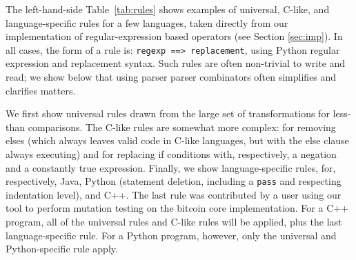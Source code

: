 \documentclass[sigconf,review, anonymous]{acmart}
\begin{document}
{%







  
The left-hand-side Table~\ref{tab:rules} shows examples of universal, C-like, and
language-specific rules for a few languages, taken directly from our
implementation of regular-expression based operators (see Section \ref{sec:imp}).  In all cases, the form of a rule is: {\tt regexp
  ==> replacement}, using Python regular expression and replacement
syntax.  Such rules are often non-trivial to write and read; we show
below that using parser parser combinators often simplifies and
clarifies matters.

We first show universal rules drawn from the large set of transformations for
less-than comparisons.  The C-like rules are somewhat more
complex: for removing elses (which always leaves valid code in
C-like languages, but with the else clause always executing) and for
replacing if conditions with, respectively, a negation and a
constantly true expression.  Finally, we show
language-specific rules, for, respectively, Java, Python (statement
deletion, including a {\tt pass} and respecting indentation level),
and C++.  The last rule was contributed by a user using our tool to
perform mutation testing on the bitcoin core implementation.  For a
C++ program, all of the universal rules and C-like rules will be
applied, plus the last language-specific rule.  For a Python
program, however, only the universal and Python-specific rule apply.


}
\end{document}
